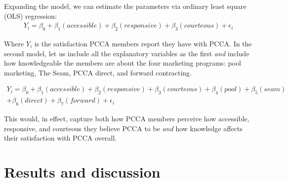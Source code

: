 \documentclass[a4paper]{article}
\begin{document}
Expanding the model, we can estimate the parameters via ordinary least square (OLS) regression:
\begin{align}
	Y_{i}=\beta_{0}+\beta_{1}(accessible)+\beta_{2}(responsive)+\beta_{3}(courteous)+\epsilon_{i}
\end{align}

Where $Y_{i}$ is the satisfaction PCCA members report they have with PCCA. In the second model, let us include all the explanatory variables as the first \emph{and} include how knowledgeable the members are about the four marketing programs: pool marketing, The Seam, PCCA direct, and forward contracting.

\begin{equation}
	\begin{split}
		Y_{i}=\beta_{0}+\beta_{1}(accessible)+\beta_{2}(responsive)+\beta_{3}(courteous)+\beta_{4}(pool)+\beta_{5}(seam) \\ +\beta_{6}(direct)+\beta_{7}(forward)+\epsilon_{i}
	\end{split}
\end{equation}

This would, in effect, capture both how PCCA members perceive how accessible, responsive, and courteous they believe PCCA to be \emph{and} how knowledge affects their satisfaction with PCCA overall.


\section{Results and discussion}
\end{document}
